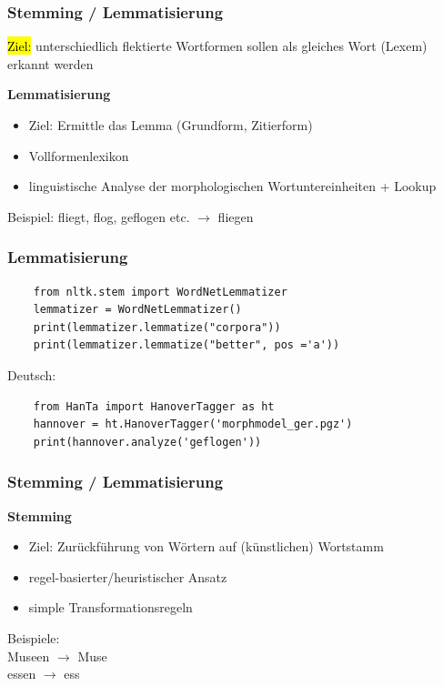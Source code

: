 
\begin{frame}
    \frametitle{Stemming / Lemmatisierung}
    \hl{Ziel:} unterschiedlich flektierte Wortformen sollen als gleiches Wort (Lexem) erkannt werden
    
    \textbf{Lemmatisierung}
    \begin{itemize}
    \item Ziel: Ermittle das Lemma (Grundform, Zitierform)
    \item Vollformenlexikon
    \item linguistische Analyse der morphologischen Wortuntereinheiten + Lookup 
    \end{itemize}
    Beispiel: 
    fliegt, flog, geflogen etc. $\rightarrow$ fliegen
\end{frame}
    
    
\begin{frame}[fragile]
    \frametitle{Lemmatisierung}


    \begin{verbatim}
    from nltk.stem import WordNetLemmatizer 
    lemmatizer = WordNetLemmatizer()
    print(lemmatizer.lemmatize("corpora"))
    print(lemmatizer.lemmatize("better", pos ='a'))
    \end{verbatim}

    Deutsch:
    \begin{verbatim}
    from HanTa import HanoverTagger as ht
    hannover = ht.HanoverTagger('morphmodel_ger.pgz')
    print(hannover.analyze('geflogen'))
    \end{verbatim}
\end{frame}
    
    
\begin{frame}
    \frametitle{Stemming / Lemmatisierung}

    \textbf{Stemming}
    \begin{itemize}
    \item Ziel: Zurückführung von Wörtern auf (künstlichen) Wortstamm
    \item regel-basierter/heuristischer Ansatz
    \item simple Transformationsregeln
    \end{itemize}

    Beispiele: \\
    Museen $\rightarrow$ Muse\\
    essen $\rightarrow$ ess
    
\end{frame}
    
